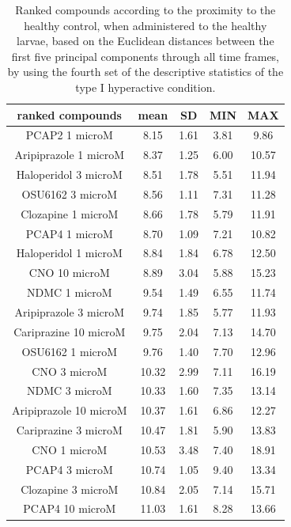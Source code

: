\documentclass[a4paper,12pt]{article}
\begin{document}
\begin{table}[h!]\tiny
\centering
\caption{Ranked compounds according to the proximity to the healthy control, when administered to the healthy larvae, based on the Euclidean distances between the first five principal components through all time frames, by using the fourth set of the descriptive statistics of the type I hyperactive condition.}
\begin{tabular}{|c|c|c|c|c|}
\hline
ranked compounds             & mean & SD   & MIN  & MAX   \\ \hline
PCAP2 1 microM         & 8.15  & 1.61 & 3.81  & 9.86  \\ \hline
Aripiprazole 1 microM  & 8.37  & 1.25 & 6.00     & 10.57 \\ \hline
Haloperidol 3 microM   & 8.51  & 1.78 & 5.51  & 11.94 \\ \hline
OSU6162 3 microM       & 8.56  & 1.11 & 7.31  & 11.28 \\ \hline
Clozapine 1 microM     & 8.66  & 1.78 & 5.79  & 11.91 \\ \hline
PCAP4 1 microM       & 8.70   & 1.09 & 7.21  & 10.82 \\ \hline
Haloperidol 1 microM   & 8.84  & 1.84 & 6.78  & 12.50  \\ \hline
CNO 10 microM          & 8.89  & 3.04 & 5.88  & 15.23 \\ \hline
NDMC 1 microM          & 9.54  & 1.49 & 6.55  & 11.74 \\ \hline
Aripiprazole 3 microM  & 9.74  & 1.85 & 5.77  & 11.93 \\ \hline
Cariprazine 10 microM  & 9.75  & 2.04 & 7.13  & 14.70  \\ \hline
OSU6162 1 microM       & 9.76  & 1.40  & 7.70   & 12.96 \\ \hline
CNO 3 microM           & 10.32 & 2.99 & 7.11  & 16.19 \\ \hline
NDMC 3 microM          & 10.33 & 1.60  & 7.35  & 13.14 \\ \hline
Aripiprazole 10 microM & 10.37 & 1.61 & 6.86  & 12.27 \\ \hline
Cariprazine 3 microM   & 10.47 & 1.81 & 5.90   & 13.83 \\ \hline
CNO 1 microM           & 10.53 & 3.48 & 7.40   & 18.91 \\ \hline
PCAP4 3 microM       & 10.74 & 1.05 & 9.40   & 13.34 \\ \hline
Clozapine 3 microM     & 10.84 & 2.05 & 7.14  & 15.71 \\ \hline
PCAP4 10 microM      & 11.03 & 1.61 & 8.28  & 13.66 \\ \hline

\end{tabular}
\end{table}
\end{document}
